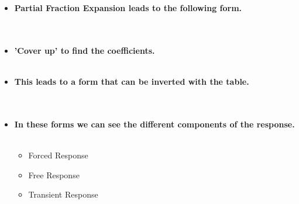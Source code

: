 \documentclass[11pt]{article}
\begin{document}
\begin{itemize}
\item \textbf{\large Partial Fraction Expansion leads to the following form.}\\\\

	 \\

\item \textbf{\large 'Cover up' to find the coefficients.}\\\\


\item \textbf{\large This leads to a form that can be inverted with the table.}\\

 \\\\


\newpage

\item \textbf{\large In these forms we can see the different components of the response.}\\

 \vspace{20mm}\\


\Large
\begin{itemize}

\item Forced Response\\

\item Free Response\\

\item Transient Response\\


\end{itemize}
\end{itemize}
\end{document}
